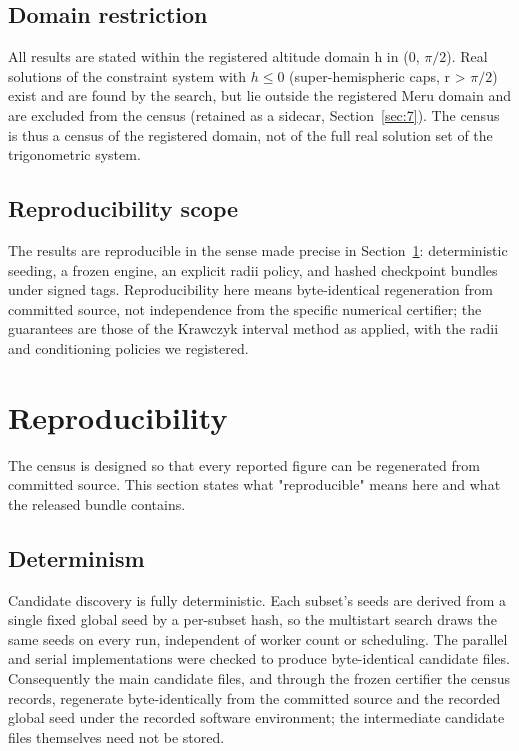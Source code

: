 \documentclass[pdflatex,sn-mathphys-num]{sn-jnl}
\begin{document}
\subsection{Domain restriction}\label{sec:8.5}

All results are stated within the registered altitude domain h in (0, $\pi/2$). Real solutions of the constraint system with $h\le 0$ (super-hemispheric caps, r > $\pi/2$) exist and are found by the search, but lie outside the registered Meru domain and are excluded from the census (retained as a sidecar, Section~\ref{sec:7}). The census is thus a census of the registered domain, not of the full real solution set of the trigonometric system.

\subsection{Reproducibility scope}\label{sec:8.6}

The results are reproducible in the sense made precise in Section~\ref{sec:9}: deterministic seeding, a frozen engine, an explicit radii policy, and hashed checkpoint bundles under signed tags. Reproducibility here means byte-identical regeneration from committed source, not independence from the specific numerical certifier; the guarantees are those of the Krawczyk interval method as applied, with the radii and conditioning policies we registered.

\section{Reproducibility}\label{sec:9}

The census is designed so that every reported figure can be regenerated from committed source. This section states what "reproducible" means here and what the released bundle contains.

\subsection{Determinism}\label{sec:9.1}

Candidate discovery is fully deterministic. Each subset's seeds are derived from a single fixed global seed by a per-subset hash, so the multistart search draws the same seeds on every run, independent of worker count or scheduling. The parallel and serial implementations were checked to produce byte-identical candidate files. Consequently the main candidate files, and through the frozen certifier the census records, regenerate byte-identically from the committed source and the recorded global seed under the recorded software environment; the intermediate candidate files themselves need not be stored.
\end{document}
